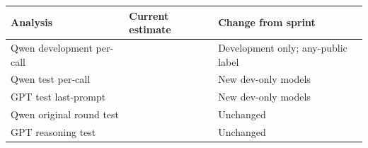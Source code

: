 \begin{tabular}{lll}
\toprule
Analysis & Current estimate & Change from sprint \\
\midrule
Qwen development per-call & \qwenCallProbe{} \qwenCallProbeCI{} & Development only; any-public label \\
Qwen test per-call & \qwenFreshCallProbe{} \qwenFreshCallProbeCI{} & New dev-only models \\
GPT test last-prompt & \gptossFreshCallProbe{} \gptossFreshCallProbeCI{} & New dev-only models \\
Qwen original round test & \qwenFreshNearProbe{} \qwenFreshNearProbeCI{} & Unchanged \\
GPT reasoning test & \gptossFreshReasoning{} \gptossFreshReasoningCI{} & Unchanged \\
\bottomrule
\end{tabular}
